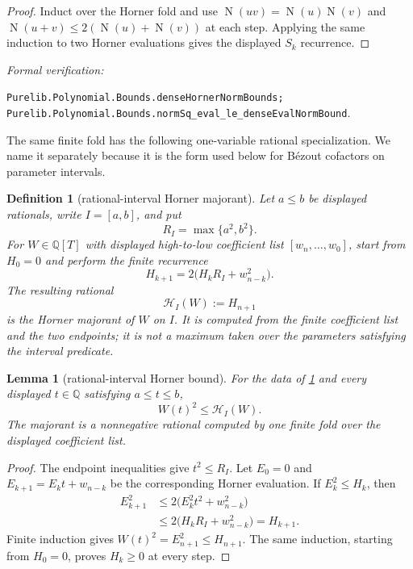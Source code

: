 \documentclass[11pt]{article}
\newtheorem{lemma}[theorem]{Lemma}
\newtheorem{definition}[theorem]{Definition}
\newcommand{\Q}{\mathbb{Q}}
\newcommand{\Norm}[1]{\operatorname{N}\!\left(#1\right)}
\newcommand{\leanref}[1]{\par\smallskip\noindent
  \emph{Formal verification:}\par\nobreak
  {\raggedright\nolinkurl{#1}.\par}}
\begin{document}
\begin{proof}
Induct over the Horner fold and use
$\Norm{uv}=\Norm u\Norm v$ and
$\Norm{u+v}\le2(\Norm u+\Norm v)$ at each step.  Applying the same induction
to two Horner evaluations gives the displayed $S_k$ recurrence.
\end{proof}

\leanref{Purelib.Polynomial.Bounds.denseHornerNormBounds;
Purelib.Polynomial.Bounds.normSq_eval_le_denseEvalNormBound}

The same finite fold has the following one-variable rational specialization.
We name it separately because it is the form used below for B\'ezout
cofactors on parameter intervals.

\begin{definition}[rational-interval Horner majorant]
\label{def:interval-horner-majorant}
Let $a\le b$ be displayed rationals, write $I=[a,b]$, and put
\[
                         R_I=\max\{a^2,b^2\}.
\]
For $W\in\Q[T]$ with displayed high-to-low coefficient list
$[w_n,\ldots,w_0]$, start from $H_0=0$ and perform the finite recurrence
\[
                  H_{k+1}=2\bigl(H_kR_I+w_{n-k}^2\bigr).
\]
The resulting rational
\[
                         \mathcal H_I(W):=H_{n+1}
\]
is the \emph{Horner majorant} of $W$ on $I$.  It is computed from the finite
coefficient list and the two endpoints; it is not a maximum taken over the
parameters satisfying the interval predicate.
\end{definition}

\begin{lemma}[rational-interval Horner bound]
\label{lem:interval-horner-majorant}
For the data of \cref{def:interval-horner-majorant} and every displayed
$t\in\Q$ satisfying $a\le t\le b$,
\[
                         W(t)^2\le\mathcal H_I(W).
\]
The majorant is a nonnegative rational computed by one finite fold over the
displayed coefficient list.
\end{lemma}

\begin{proof}
The endpoint inequalities give $t^2\le R_I$.  Let $E_0=0$ and
$E_{k+1}=E_kt+w_{n-k}$ be the corresponding Horner evaluation.  If
$E_k^2\le H_k$, then
\[
 \begin{aligned}
 E_{k+1}^2
   &\le 2\bigl(E_k^2t^2+w_{n-k}^2\bigr)\\
   &\le 2\bigl(H_kR_I+w_{n-k}^2\bigr)=H_{k+1}.
 \end{aligned}
\]
Finite induction gives $W(t)^2=E_{n+1}^2\le H_{n+1}$.  The same induction,
starting from $H_0=0$, proves $H_k\ge0$ at every step.
\end{proof}
\end{document}
